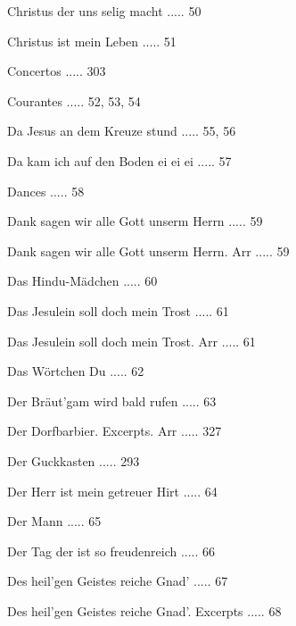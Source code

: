 \documentclass[twocolumn]{book}
\begin{document}
\newline 
Christus der uns selig macht ..... 50

\newline 
Christus ist mein Leben ..... 51

\newline 
Concertos ..... 303

\newline 
Courantes ..... 52, 53, 54

\newline 
Da Jesus an dem Kreuze stund ..... 55, 56

\newline 
Da kam ich auf den Boden ei ei ei ..... 57

\newline 
Dances ..... 58

\newline 
Dank sagen wir alle Gott unserm Herrn ..... 59

\newline 
Dank sagen wir alle Gott unserm Herrn. Arr ..... 59

\newline 
Das Hindu-Mädchen ..... 60

\newline 
Das Jesulein soll doch mein Trost ..... 61

\newline 
Das Jesulein soll doch mein Trost. Arr ..... 61

\newline 
Das Wörtchen Du ..... 62

\newline 
Der Bräut'gam wird bald rufen ..... 63

\newline 
Der Dorfbarbier. Excerpts. Arr ..... 327

\newline 
Der Guckkasten ..... 293

\newline 
Der Herr ist mein getreuer Hirt ..... 64

\newline 
Der Mann ..... 65

\newline 
Der Tag der ist so freudenreich ..... 66

\newline 
Des heil'gen Geistes reiche Gnad' ..... 67

\newline 
Des heil'gen Geistes reiche Gnad'. Excerpts ..... 68
\end{document}
